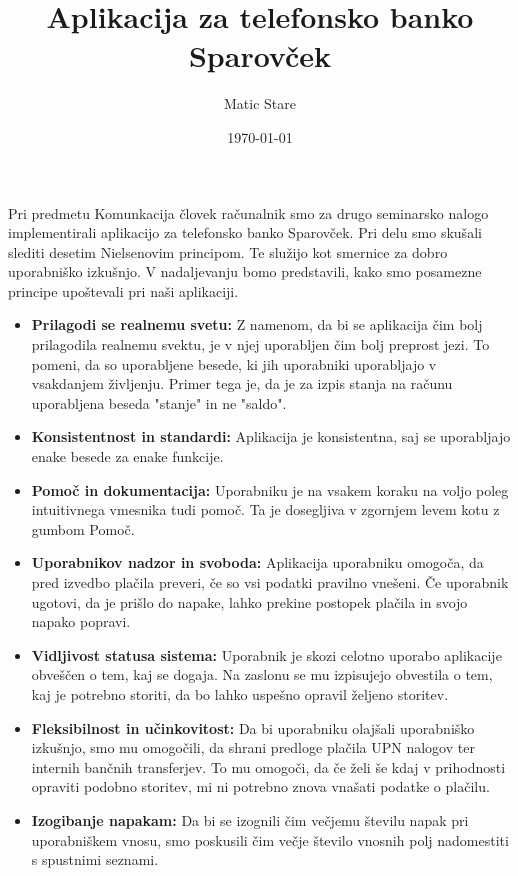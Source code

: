 \documentclass{article}
\begin{document}
\title{Aplikacija za telefonsko banko Sparovček}
\author{Matic Stare}
\date{\today}

\maketitle

Pri predmetu Komunkacija človek računalnik smo za drugo seminarsko nalogo implementirali aplikacijo za telefonsko banko Sparovček. Pri delu smo skušali slediti desetim Nielsenovim principom. Te služijo kot smernice za dobro uporabniško izkušnjo. V nadaljevanju bomo predstavili, kako smo posamezne principe upoštevali pri naši aplikaciji.
\begin {itemize}
    \item \textbf{Prilagodi se realnemu svetu:} Z namenom, da bi se aplikacija čim bolj prilagodila realnemu svektu, je v njej uporabljen čim bolj preprost jezi. To pomeni, da so uporabljene besede, ki jih uporabniki uporabljajo v vsakdanjem življenju. Primer tega je, da je za izpis stanja na računu uporabljena beseda "stanje" in ne "saldo".
    \item \textbf{Konsistentnost in standardi:} Aplikacija je konsistentna, saj se uporabljajo enake besede za enake funkcije.
    \item \textbf{Pomoč in dokumentacija:} Uporabniku je na vsakem koraku na voljo poleg intuitivnega vmesnika tudi pomoč. Ta je dosegljiva v zgornjem levem kotu z gumbom Pomoč.
    \item \textbf{Uporabnikov nadzor in svoboda:} Aplikacija uporabniku omogoča, da pred izvedbo plačila preveri, če so vsi podatki pravilno vnešeni. Če uporabnik ugotovi, da je prišlo do napake, lahko prekine postopek plačila in svojo napako popravi.
    \item \textbf{Vidljivost statusa sistema:} Uporabnik je skozi celotno uporabo aplikacije obveščen o tem, kaj se dogaja. Na zaslonu se mu izpisujejo obvestila o tem, kaj je potrebno storiti, da bo lahko uspešno opravil željeno storitev.
    \item \textbf{Fleksibilnost in učinkovitost:} Da bi uporabniku olajšali uporabniško izkušnjo, smo mu omogočili, da shrani predloge plačila UPN nalogov ter internih bančnih transferjev. To mu omogoči, da če želi še kdaj v prihodnosti opraviti podobno storitev, mi ni potrebno znova vnašati podatke o plačilu.
    \item \textbf{Izogibanje napakam:} Da bi se izognili čim večjemu številu napak pri uporabniškem vnosu, smo poskusili čim večje število vnosnih polj nadomestiti s spustnimi seznami.

\end{itemize}
\end{document}
